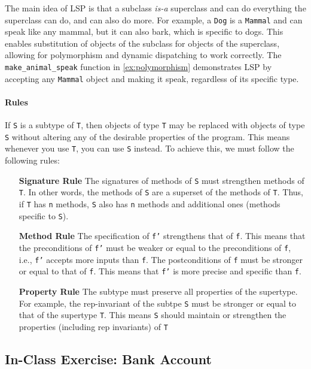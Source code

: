 \documentclass[oneside,11pt,dvipsnames]{book}
\newcommand{\code}[1]{\texttt{#1}}
\begin{document}
The main idea of LSP is that a subclass \emph{is-a} superclass and can do everything the superclass can do, and can also do more. For example, a \code{Dog} is a \code{Mammal} and can speak like any mammal, but it can also bark, which is specific to dogs.
This enables substitution of objects of the subclass for objects of the superclass, allowing for polymorphism and dynamic dispatching to work correctly. The \code{make\_animal\_speak} function in \autoref{ex:polymorphism} demonstrates LSP by accepting any \code{Mammal} object and making it speak, regardless of its specific type.


\paragraph{Rules} If \code{S} is a subtype of \code{T}, then objects of type \code{T} may be replaced with objects of type \code{S} without altering any of the desirable properties of the program. This means whenever you use \code{T}, you can use \code{S} instead. To achieve this, we must follow the following rules:
\begin{itemize}
\item[\textbf{Signature Rule}] The signatures of methods of \code{S} must strengthen methods of \code{T}. In other words, the methods of \code{S} are a superset of the methods of \code{T}. Thus, if \code{T} has \code{n} methods, \code{S} also has \code{n} methods and additional ones (methods specific to \code{S}). 

\item[\textbf{Method Rule}] The specification of \code{f'} strengthens that of \code{f}. This means that the preconditions of \code{f'} must be weaker or equal to the preconditions of \code{f}, i.e.,  \code{f'} accepts more inputs than \code{f}.  The postconditions of \code{f} must be stronger or equal to that of \code{f}. This means that \code{f'} is more precise and specific than \code{f}.

\item[\textbf{Property Rule}] The subtype must preserve all properties of the supertype.  For example, the rep-invariant of the subtpe \code{S} must be stronger or equal to that of the supertype \code{T}. This means \code{S} should maintain or strengthen the properties (including rep invariants) of \code{T}
\end{itemize}

\subsection{In-Class Exercise: Bank Account}
\end{document}
